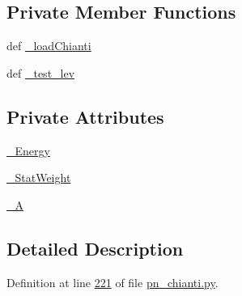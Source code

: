 \subsection*{Private Member Functions}
\begin{DoxyCompactItemize}
\item 
def \hyperlink{classpyneb_1_1utils_1_1pn__chianti_1_1___atom_chianti_a51852adf7bfefb13c29781d9ba297164}{\-\_\-load\-Chianti}
\item 
def \hyperlink{classpyneb_1_1utils_1_1pn__chianti_1_1___atom_chianti_a596a6602f53c54689316ee543e407c49}{\-\_\-test\-\_\-lev}
\end{DoxyCompactItemize}
\subsection*{Private Attributes}
\begin{DoxyCompactItemize}
\item 
\hyperlink{classpyneb_1_1utils_1_1pn__chianti_1_1___atom_chianti_a7c9c9c75a6bacb0f6533e870cf556035}{\-\_\-\-Energy}
\item 
\hyperlink{classpyneb_1_1utils_1_1pn__chianti_1_1___atom_chianti_a8a718be321d05e4212ff5be195c92b42}{\-\_\-\-Stat\-Weight}
\item 
\hyperlink{classpyneb_1_1utils_1_1pn__chianti_1_1___atom_chianti_a4d531860236fc5a6564cc861b28cabe7}{\-\_\-\-A}
\end{DoxyCompactItemize}


\subsection{Detailed Description}


Definition at line \hyperlink{pn__chianti_8py_source_l00221}{221} of file \hyperlink{pn__chianti_8py_source}{pn\-\_\-chianti.\-py}.



